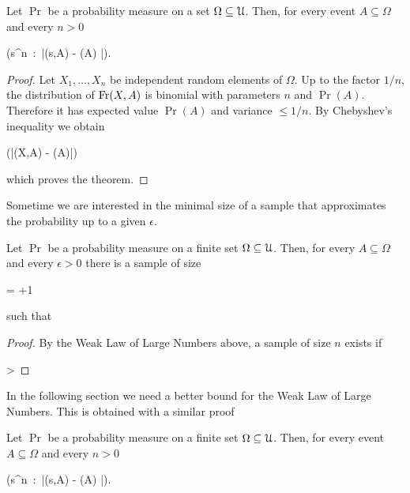 \documentclass[scombinatorics.tex]{subfiles}
\begin{document}



\begin{void_thm}
  Let $\Pr$ be a probability measure on a set $\Omega\subseteq\EuScript U$.
  Then, for every event $A\subseteq\Omega$ and every $n>0$
  
  {\ge}
  {\Pr \Big(s\in\Omega^n\ :\ \big|\Fr(s,A) - \Pr(A)  \big|\ge\epsilon\Big).}
\end{void_thm}


\begin{proof}
  Let $X_1,\dots,X_n$ be independent random elements of $\Omega$.
  Up to the factor $1/n$, the distribution of $\mathop{\rm Fr}(X,A)$ is binomial with parameters $n$ and $\Pr(A)$.
  Therefore it has expected value $\Pr(A)$ and  variance $\le1/n$. 
  By Chebyshev's inequality we obtain 
  
  {\ge}
  {\Pr\Big(\big|\Fr(X,A) - \Pr(A)\big|\ge\epsilon\Big)}

  which proves the theorem.
\end{proof}

Sometime we are interested in the minimal size of a sample that approximates the probability up to a given $\epsilon$.

\begin{corollary}
  Let $\Pr$ be a probability measure on a finite set $\Omega\subseteq\EuScript U$.
  Then, for every $A\subseteq\Omega$ and every $\epsilon>0$ there is a sample of size

      {=}
      {\left\lfloor{}+1\right\rfloor} 
      
  such that

\end{corollary}


\begin{proof}
  By the Weak Law of Large Numbers above, a sample of size $n$ exists if

      {>}
      {}
\end{proof}


In the following section we need a better bound for the Weak Law of Large Numbers.
This is obtained with a similar proof

\begin{void_thm}
  Let $\Pr$ be a probability measure on a finite set $\Omega\subseteq\EuScript U$.
  Then, for every event $A\subseteq\Omega$ and every $n>0$
  
  {\ge}
  {\Pr \Big(s\in\Omega^n\ :\ \big|\Fr(s,A) - \Pr(A)  \big|\ge\epsilon\Big).}
\end{void_thm}
\end{document}
